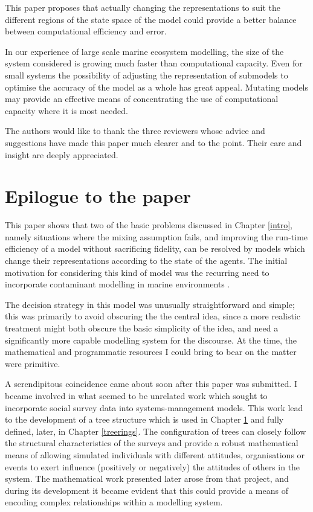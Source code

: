This paper proposes that actually changing the representations to suit the
different regions of the state space of the model could provide a better
balance between computational efficiency and error.

In our experience of large scale marine ecosystem modelling, the size of the
system considered is growing much faster than computational capacity. Even for
small systems the possibility of adjusting the representation of submodels to
optimise the accuracy of the model as a whole has great appeal. Mutating
models may provide an effective means of concentrating the use of
computational capacity where it is most needed.


The authors would like to thank the three reviewers whose advice and
suggestions have made this paper much clearer and to the point. Their care and
insight are deeply appreciated.
\pagebreak

\section{Epilogue to the paper}

This paper shows that two of the basic problems discussed in Chapter \ref{intro},
namely situations where the mixing assumption fails, and improving the
run-time efficiency of a model without sacrificing fidelity, can be
resolved by models which change their representations according to the
state of the agents.  The
initial motivation for considering this kind of model was the
recurring need to incorporate contaminant modelling in marine
environments \cite{Lyne1994pmez5, Gray06:1, GrayNingaloo}. 

The decision strategy in this model was unusually straightforward and
simple; this was primarily to avoid obscuring the the central idea,
since a more realistic treatment might both obscure the basic
simplicity of the idea, and need a significantly more capable
modelling system for the discourse.  At the time, the mathematical and
programmatic resources I could bring to bear on the matter were
primitive.

A serendipitous coincidence came about soon after this paper was
submitted. I became involved in what seemed to be unrelated work which
sought to incorporate social survey data into systems-management
models. This work lead to the development of a tree structure which is
used in Chapter \ref{} and fully defined, later, in Chapter
\ref{treerings}. The configuration of trees can closely follow the
structural characteristics of the surveys and provide a robust
mathematical means of allowing simulated individuals with different
attitudes, organisations or events to exert influence (positively or
negatively) the attitudes of others in the system.  The mathematical
work presented later arose from that project, and during its
development it became evident that this could provide a means of
encoding complex relationships within a modelling system.







